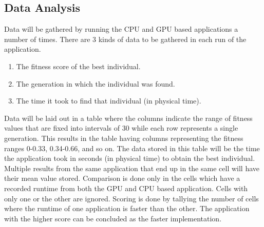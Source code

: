 \subsection{Data Analysis}
Data will be gathered by running the CPU and GPU based applications a number of
times. There are 3 kinds of data to be gathered in each run of the application.

\begin{enumerate}
  \item The fitness score of the best individual.
  \item The generation in which the individual was found.
  \item The time it took to find that individual (in physical time).
\end{enumerate}

Data will be laid out in a table where the columns indicate the range of fitness
values that are fixed into intervals of 30 while each row represents a single
generation. This results in the table having columns representing the fitness
ranges 0-0.33, 0.34-0.66, and so on. The data stored in this table
will be the time the application took in seconds (in physical time) to obtain
the best individual. Multiple results from the same application that end up in
the same cell will have their mean value stored. Comparison is done only in the
cells which have a recorded runtime from both the GPU and CPU based application.
Cells with only one or the other are ignored. Scoring is done by tallying the
number of cells where the runtime of one application is faster than the other.
The application with the higher score can be concluded as the faster 
implementation.